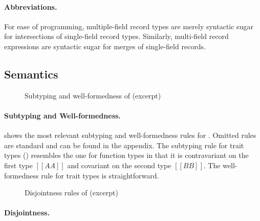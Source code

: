 \paragraph{Abbreviations.}
For ease of programming, multiple-field record types are merely syntactic sugar
for intersections of single-field record types. Similarly, multi-field record
expressions are syntactic sugar for merges of single-field records.

\subsection{Semantics}

\begin{figure}[t]
  \centering
  \caption{Subtyping and well-formedness of \sedel (excerpt)}
  \label{fig:trait:typesystem}
\end{figure}


\paragraph{Subtyping and Well-formedness.}

 shows the most relevant subtyping and well-formedness
rules for \sedel. Omitted rules are standard and can be found in the appendix.
The subtyping rule for trait types () resembles the one for function
types in that it is contravariant on the first type $[[AA]]$
and covariant on the second type $[[BB]]$. The well-formedness rule for trait
types is straightforward.

\begin{figure}[t]
  \centering
\begin{small}
\end{small}
\caption{Disjointness rules of \sedel (excerpt)}
  \label{fig:disjoint}
\end{figure}


\paragraph{Disjointness.}

